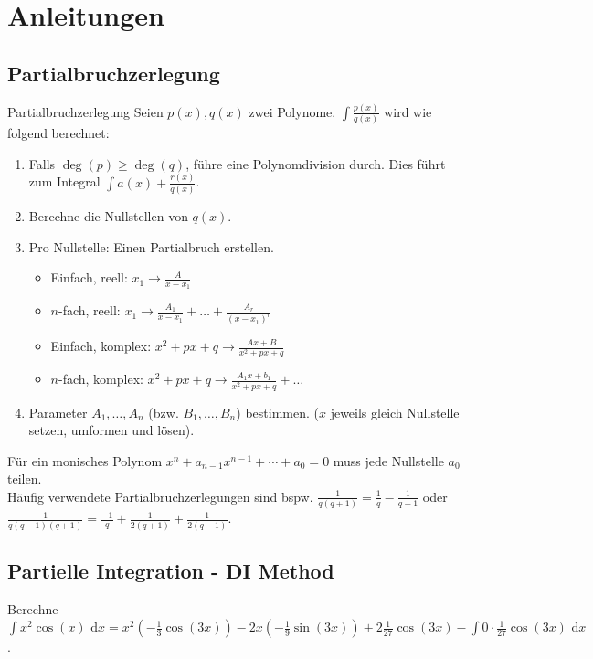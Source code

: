 \documentclass[a4paper,10pt]{article}
\def\dx{\text{ d}x}
\begin{document}
\section{Anleitungen}

\subsection{Partialbruchzerlegung}

\begin{mainbox}{Partialbruchzerlegung}
  Seien $p(x), q(x)$ zwei Polynome. $\int \frac{p(x)}{q(x)}$ wird wie folgend berechnet:
  \begin{enumerate}
   \item Falls $\deg(p) \ge \deg(q)$, führe eine Polynomdivision durch. Dies führt zum Integral $\int a(x) + \frac{r(x)}{q(x)}$.
   \item Berechne die Nullstellen von $q(x)$.
   \item Pro Nullstelle: Einen Partialbruch erstellen.
   \begin{itemize}[left=0pt]
    \item Einfach, reell: $x_1 \to \frac{A}{x - x_1}$
    \item $n$-fach, reell: $x_1 \to \frac{A_1}{x - x_1} + \ldots + \frac{A_r}{(x-x_1)^r}$ 
    \item Einfach, komplex: $x^2 + px + q \to \frac{Ax + B} {x^2 + px + q}$
    \item $n$-fach, komplex: $x^2 + px + q \to \frac{A_1x+b_1}{x^2+px+q} + \ldots$
   \end{itemize}
   \item Parameter $A_1, \ldots, A_n$ (bzw. $B_1, \ldots, B_n$) bestimmen. ($x$ jeweils gleich Nullstelle setzen, umformen und lösen).
 
  \end{enumerate}
 \end{mainbox}

Für ein monisches Polynom $x^n + a_{n-1} x^{n-1} + \cdots + a_0 = 0$ muss jede Nullstelle $a_0$ teilen.\\

Häufig verwendete Partialbruchzerlegungen sind bspw. $\frac{1}{q(q+1)} = \frac{1}{q} - \frac{1}{q + 1}$ oder $\frac{1}{q(q-1)(q+1)} = \frac{-1}{q} + \frac{1}{2(q+1)} + \frac{1}{2(q-1)}$.

\subsection{Partielle Integration - DI Method}
Berechne $\int x^2 \cos(x) \dx = x^2 (-\frac{1}{3}\cos(3x)) - 2x(-\frac{1}{9}\sin(3x)) + 2\frac{1}{27}\cos(3x) - \int 0 \cdot \frac{1}{27} \cos(3x) \dx$.
\end{document}
